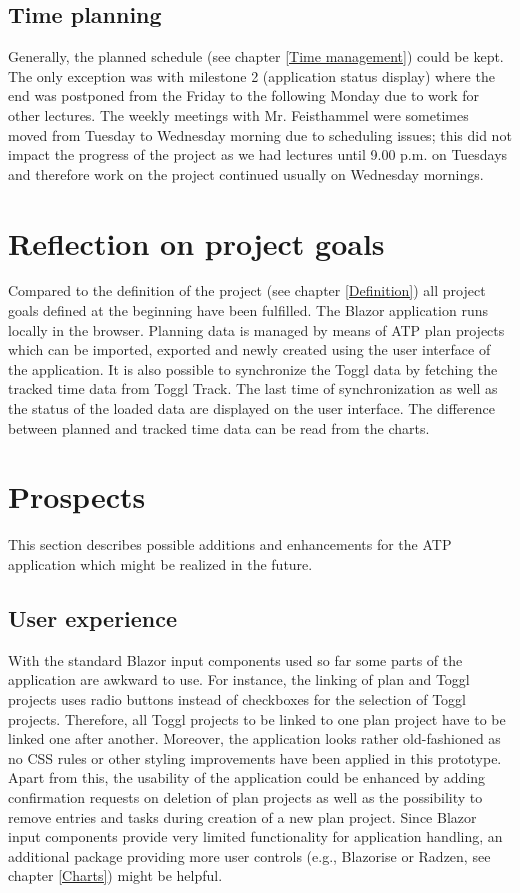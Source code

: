 \subsection{Time planning}
Generally, the planned schedule (see chapter \ref{Time management}) could be kept. The only exception was with milestone 2 (application status display) where the end was postponed from the Friday to the following Monday due to work for other lectures. The weekly meetings with Mr. Feisthammel were sometimes moved from Tuesday to Wednesday morning due to scheduling issues; this did not impact the progress of the project as we had lectures until 9.00 p.m. on Tuesdays and therefore work on the project continued usually on Wednesday mornings.

\section{Reflection on project goals}
Compared to the definition of the project (see chapter \ref{Definition}) all project goals defined at the beginning have been fulfilled. The Blazor application runs locally in the browser. Planning data is managed by means of ATP plan projects which can be imported, exported and newly created using the user interface of the application. It is also possible to synchronize the Toggl data by fetching the tracked time data from Toggl Track. The last time of synchronization as well as the status of the loaded data are displayed on the user interface. The difference between planned and tracked time data can be read from the charts.

\section{Prospects}
This section describes possible additions and enhancements for the ATP application which might be realized in the future.

\subsection{User experience}
With the standard Blazor input components used so far some parts of the application are awkward to use. For instance, the linking of plan and Toggl projects uses radio buttons instead of checkboxes for the selection of Toggl projects. Therefore, all Toggl projects to be linked to one plan project have to be linked one after another. Moreover, the application looks rather old-fashioned as no CSS rules or other styling improvements have been applied in this prototype. Apart from this, the usability of the application could be enhanced by adding confirmation requests on deletion of plan projects as well as the possibility to remove entries and tasks during creation of a new plan project. Since Blazor input components provide very limited functionality for application handling, an additional package providing more user controls (e.g., Blazorise or Radzen, see chapter \ref{Charts}) might be helpful.

